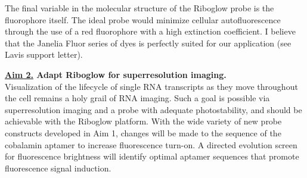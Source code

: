 The final variable in the molecular structure of the Riboglow probe is the fluorophore itself. The ideal probe would minimize cellular autofluorescence through the use of a red fluorophore with a high extinction coefficient. I believe that the Janelia Fluor series of dyes is perfectly suited for our application (see Lavis support letter).\cite{Grimmgeneralmethodfinetune2017a} 


\textbf{\underline{Aim 2.} Adapt Riboglow for superresolution imaging.}\\
Visualization of the lifecycle of single RNA transcripts as they move throughout the cell remains a holy grail of RNA imaging.\comment{[Cite]} Such a goal is possible via superresolution imaging and a probe with adequate photostability, and should be achievable with the Riboglow platform. With the wide variety of new probe constructs developed in Aim 1, changes will be made to the sequence of the cobalamin aptamer to increase fluorescence turn-on. A directed evolution screen for fluorescence brightness will identify optimal aptamer sequences that promote fluorescence signal induction.


